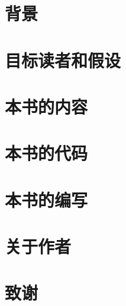 


\section*{背景}

\section*{目标读者和假设}

\section*{本书的内容}

\section*{本书的代码}

\section*{本书的编写}

\section*{关于作者}

\section*{致谢}

\newpage
